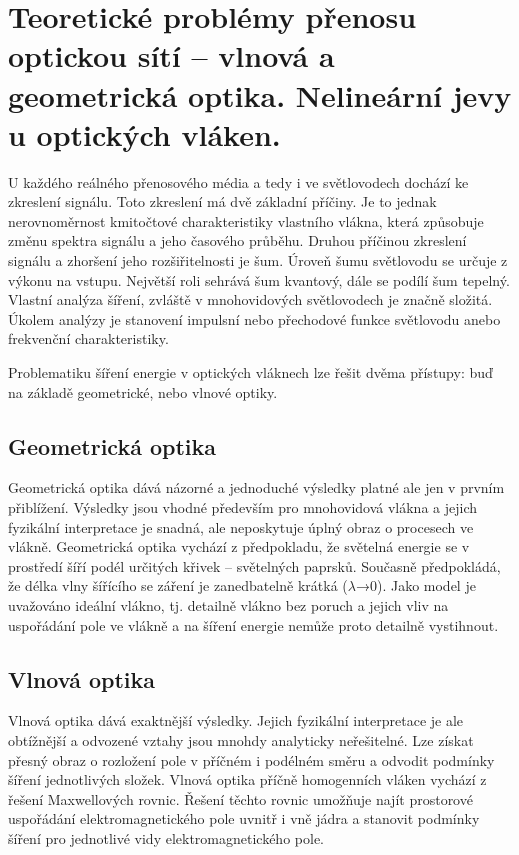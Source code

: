 \clearpage
\section{Teoretické problémy přenosu optickou sítí – vlnová a geometrická optika. Nelineární jevy u optických vláken.}

U každého reálného přenosového média a tedy i ve světlovodech dochází ke zkreslení signálu. Toto zkreslení má dvě základní příčiny. Je to jednak nerovnoměrnost kmitočtové charakteristiky vlastního vlákna, která způsobuje změnu spektra signálu a jeho časového průběhu. Druhou příčinou zkreslení signálu a zhoršení jeho rozšiřitelnosti je šum. Úroveň šumu světlovodu se určuje z výkonu na vstupu. Největší roli sehrává šum kvantový, dále se podílí šum tepelný. Vlastní analýza šíření, zvláště v mnohovidových světlovodech je značně složitá. Úkolem analýzy je stanovení impulsní nebo přechodové funkce světlovodu anebo frekvenční charakteristiky.

Problematiku šíření energie v optických vláknech lze řešit dvěma přístupy: buď na základě geometrické, nebo vlnové optiky. 

\subsection{Geometrická optika}
Geometrická optika dává názorné a jednoduché výsledky platné ale jen v prvním přiblížení. Výsledky jsou vhodné především pro mnohovidová vlákna a jejich fyzikální interpretace je snadná, ale neposkytuje úplný obraz o procesech ve vlákně. Geometrická optika vychází z předpokladu, že světelná energie se v prostředí šíří podél určitých křivek – světelných paprsků. Současně předpokládá, že délka vlny šířícího se záření je zanedbatelně krátká ($\lambda$→0). Jako model je uvažováno ideální vlákno, tj. detailně vlákno bez poruch a jejich vliv na uspořádání pole ve vlákně a na šíření energie nemůže proto detailně vystihnout.

\subsection{Vlnová optika}
Vlnová optika dává exaktnější výsledky. Jejich fyzikální interpretace je ale obtížnější a odvozené vztahy jsou mnohdy analyticky neřešitelné. Lze získat přesný obraz o rozložení pole v příčném i podélném směru a odvodit podmínky šíření jednotlivých složek. Vlnová optika příčně homogenních vláken vychází z řešení Maxwellových rovnic. Řešení těchto rovnic umožňuje najít prostorové uspořádání elektromagnetického pole uvnitř i vně jádra a stanovit podmínky šíření pro jednotlivé vidy elektromagnetického pole.

